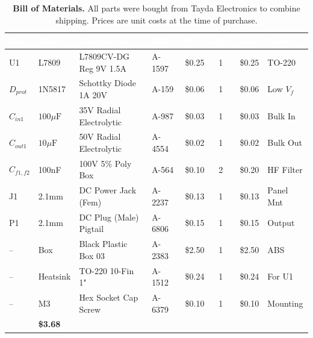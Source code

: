 \documentclass[11pt, a4paper]{report}
\begin{document}
\begin{table}[htbp]
  \centering
  \small\sffamily
  \renewcommand{\arraystretch}{1.4}
  \setlength{\tabcolsep}{4pt}


  \begin{tabular}{@{} l l l l r c r l @{}}
    \toprule
    \rowcolor{TableHeader}
    \textbf{\textcolor{white}{Des.}} &
    \textbf{\textcolor{white}{Value}} &
    \textbf{\textcolor{white}{Component}} &
    \textbf{\textcolor{white}{SKU}} &
    \textbf{\textcolor{white}{Price}} &
    \textbf{\textcolor{white}{Qty}} &
    \textbf{\textcolor{white}{Total}} &
    \textbf{\textcolor{white}{Notes}} \\
    \midrule

    U1 & L7809 & L7809CV-DG Reg 9V 1.5A & A-1597 & \$0.25 & 1 & \$0.25 & TO-220 \\
    $D_{prot}$ & 1N5817 & Schottky Diode 1A 20V & A-159 & \$0.06 & 1 & \$0.06 & Low $V_f$ \\
    $C_{in1}$ & $100\mu\text{F}$ & 35V Radial Electrolytic & A-987 & \$0.03 & 1 & \$0.03 & Bulk In \\
    $C_{out1}$ & $10\mu\text{F}$ & 50V Radial Electrolytic & A-4554 & \$0.02 & 1 & \$0.02 & Bulk Out \\
    $C_{f1,f2}$ & 100nF & 100V 5\% Poly Box & A-564 & \$0.10 & 2 & \$0.20 & HF Filter \\
    J1 & 2.1mm & DC Power Jack (Fem) & A-2237 & \$0.13 & 1 & \$0.13 & Panel Mnt \\
    P1 & 2.1mm & DC Plug (Male) Pigtail & A-6806 & \$0.15 & 1 & \$0.15 & Output \\
    -- & Box & Black Plastic Box 03 & A-2383 & \$2.50 & 1 & \$2.50 & ABS \\
    -- & Heatsink & TO-220 10-Fin 1" & A-1512 & \$0.24 & 1 & \$0.24 & For U1 \\
    -- & M3 & Hex Socket Cap Screw & A-6379 & \$0.10 & 1 & \$0.10 & Mounting \\

    \midrule
    \rowcolor{white}
    \multicolumn{6}{r}{\textbf{PROJECT TOTAL}} & \textbf{\$3.68} & \\
    \bottomrule
  \end{tabular}

  \caption{\textbf{Bill of Materials.} All parts were bought from Tayda Electronics to combine shipping. Prices are unit costs at the time of purchase.}
  \label{tab:bom_power}
\end{table}
\end{document}
